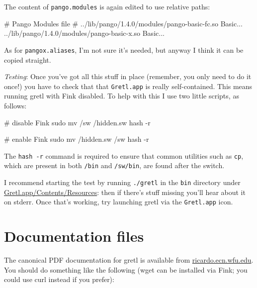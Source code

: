 \documentclass{article}
\begin{document}
The content of \texttt{pango.modules} is again edited
to use relative paths:

\begin{code}
# Pango Modules file
#
../lib/pango/1.4.0/modules/pango-basic-fc.so Basic...
../lib/pango/1.4.0/modules/pango-basic-x.so Basic...
\end{code}

As for \texttt{pangox.aliases}, I'm not sure it's needed, but anyway I
think it can be copied straight.

\textit{Testing}: Once you've got all this stuff in place (remember,
you only need to do it once!) you have to check that that
\texttt{Gretl.app} is really self-contained.  This means running gretl
with Fink disabled.  To help with this I use two little scripts, as
follows:

\begin{code}
# disable Fink
sudo mv /sw /hidden.sw
hash -r

# enable Fink
sudo mv /hidden.sw /sw
hash -r

\end{code}

The \texttt{hash -r} command is required to ensure that common
utilities such as \texttt{cp}, which are present in both \texttt{/bin}
and \texttt{/sw/bin}, are found after the switch.

I recommend starting the test by running \texttt{./gretl} in the
\texttt{bin} directory under \url{Gretl.app/Contents/Resources}: then
if there's stuff missing you'll hear about it on stderr.  Once that's
working, try launching gretl via the \texttt{Gretl.app} icon.

\section{Documentation files}

The canonical PDF documentation for gretl is available from
\url{ricardo.ecn.wfu.edu}.  You should do something like the following
(wget can be installed via Fink; you could use curl instead if you
prefer):

\end{document}
